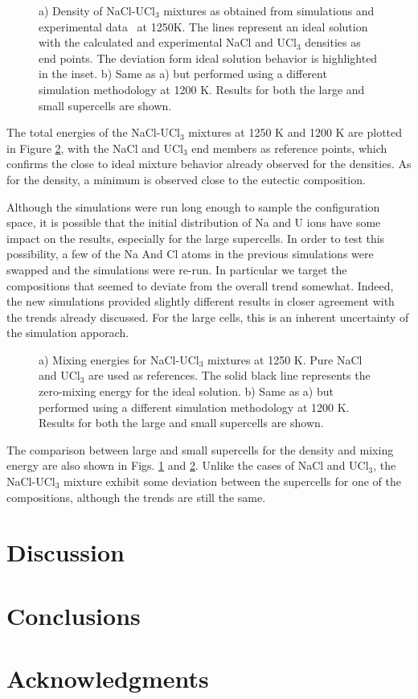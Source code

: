 \documentclass[preprint,3p,10pt,twocolumn,number,sort&compress]{elsarticle}
\begin{document}
\begin{figure}[htb]
\centering
\caption{a) Density of NaCl-UCl$_3$ mixtures as obtained from simulations and experimental data~\cite{} at 1250K. The lines represent an ideal solution with the calculated and experimental NaCl and UCl$_3$ densities as end points. The deviation form ideal solution behavior is highlighted in the inset. b) Same as a) but performed using a different simulation methodology at 1200 K. Results for both the large and small supercells are shown.} 
\label{fig:NaClUCl3}
\end{figure}

The total energies of the NaCl-UCl$_3$ mixtures at 1250 K and 1200 K are plotted in Figure \ref{fig:NaClUCl3e}, with the NaCl and UCl$_3$ end members as reference points, which confirms the close to ideal mixture behavior already observed for the densities. As for the density, a minimum is observed close to the eutectic composition. 

Although the simulations were run long enough to sample the configuration space, it is possible that the initial distribution of Na and U ions have some impact on the results, especially for the large supercells.  In order to test this possibility, a few of the Na And Cl atoms in the previous simulations were swapped and the simulations were re-run. In particular we target the compositions that seemed to deviate from the overall trend somewhat. Indeed, the new simulations provided slightly different results in closer agreement with the trends already discussed. For the large cells, this is an inherent uncertainty of the simulation apporach.

\begin{figure}[htb]
\centering
\caption{a) Mixing energies for NaCl-UCl$_3$ mixtures at 1250 K. Pure NaCl and UCl$_3$ are used as references. The solid black line represents the zero-mixing energy for the ideal solution. b) Same as a) but performed using a different simulation methodology at 1200 K. Results for both the large and small supercells are shown.} 
\label{fig:NaClUCl3e}
\end{figure}

The comparison between large and small supercells for the density and mixing energy are also shown in Figs. \ref{fig:NaClUCl3} and \ref{fig:NaClUCl3e}. Unlike the cases of NaCl and UCl$_3$, the NaCl-UCl$_3$ mixture exhibit some deviation between the supercells for one of the compositions, although the trends are still the same. 

\section{Discussion}
\label{sec:discussion}

\section{Conclusions}
\label{sec:conclusions}


\section{Acknowledgments}





\end{document}
